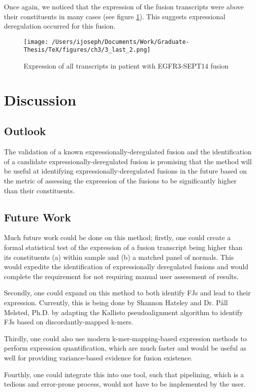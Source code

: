 Once again, we noticed that the expression of the fusion transcripts were above their constituents in many cases (see figure \ref{threefive}). This suggests expressional
deregulation occurred for this fusion.


\begin{figure}
  \centering \texttt{[image: /Users/ijoseph/Documents/Work/Graduate-Thesis/TeX/figures/ch3/3\_last\_2.png]}
  \caption{Expression of all transcripts in patient with EGFR3-SEPT14
    fusion} \label{threefive}
\end{figure}

\section{Discussion}

\subsection{Outlook}
The validation of a known expressionally-deregulated fusion and the identification of a candidate expressionally-deregulated fusion is promising that the method will be useful at identifying expressionally-deregulated fusions in the future based on the metric of assessing the expression of the fusions to be significantly higher than their constituents.

\subsection{Future Work}
  
Much future work could be done on this method; firstly, one could create a formal statistical test of the expression of a fusion transcript being higher than its constituents (a) within sample and (b) a matched panel of normals. This would expedite the identification of expressionally deregulated fusions and would complete the requirement for not requiring manual user assessment of results.

Secondly, one could expand on this method to both identify FJs and lead to their expression. Currently, this is being done by Shannon Hateley and Dr. P\'{a}ll Melsted, Ph.D. by adapting the Kallisto pseudoalignment algorithm\cite{bray_near-optimal_2016} to identify FJs based on discordantly-mapped k-mers.

Thirdly, one could also use modern k-mer-mapping-based expression methods to perform expression quantification, which are much faster and would be useful as well for providing variance-based evidence for fusion existence.

Fourthly, one could integrate this into one tool, such that pipelining, which is a tedious and error-prone process, would not have to be implemented by the user.










